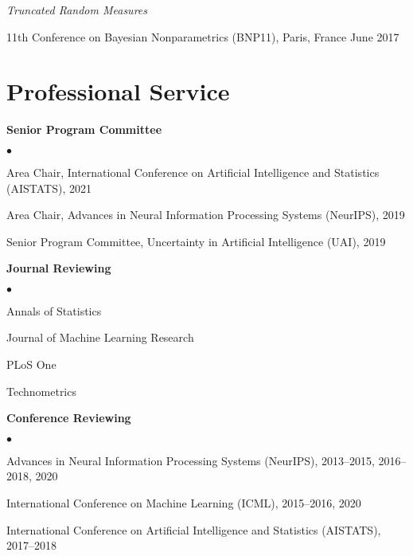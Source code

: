 \documentclass[margin,line]{res}
\newenvironment{list2}{
  \begin{list}{$\bullet$}{%
      \setlength{\itemsep}{0in}
      \setlength{\parsep}{0in} \setlength{\parskip}{0in}
      \setlength{\topsep}{0in} \setlength{\partopsep}{0in}
      \setlength{\leftmargin}{0.2in}}}{\end{list}}
\newenvironment{talkgroup}{\setlength{\parskip}{3pt}\everypar{\hangafter=1\hangindent=1em\relax}\par}{\par\everypar{\hangafter=0\relax}}
\begin{document}
\begin{resume}
\emph{Truncated Random Measures}
\begin{talkgroup}
11th Conference on Bayesian Nonparametrics (BNP11), Paris, France \hfill June 2017
\end{talkgroup}

\section{\sc Professional Service}
\textbf{Senior Program Committee}
\begin{list2}
\item {Area Chair}, International Conference on Artificial Intelligence and Statistics (AISTATS), 2021
\item {Area Chair}, Advances in Neural Information Processing Systems (NeurIPS), 2019
\item {Senior Program Committee}, Uncertainty in Artificial Intelligence (UAI), 2019
\end{list2}

\textbf{Journal Reviewing}
\begin{list2}
\item Annals of Statistics
\item Journal of Machine Learning Research
\item PLoS One
\item Technometrics
\end{list2}

\textbf{Conference Reviewing}
\begin{list2}
\item Advances in Neural Information Processing Systems (NeurIPS), 2013--2015, 2016--2018, 2020
\item International Conference on Machine Learning (ICML), 2015--2016, 2020
\item International Conference on Artificial Intelligence and Statistics (AISTATS), 2017--2018
\end{list2}

%


\end{resume}
\end{document}
